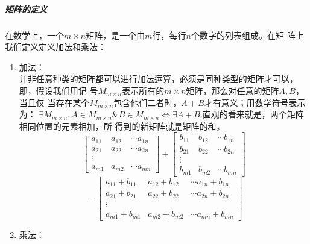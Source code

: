 \documentclass[a4paper,12pt]{ctexart}
\begin{document}
		\subparagraph{矩阵的定义}		
		在数学上，一个$m \times n$矩阵，是一个由$m$行，每行$n$个数字的列表组成。在矩
		阵上我们定义定义加法和乘法：
		\begin{enumerate}
		\item{加法：}\\
		并非任意种类的矩阵都可以进行加法运算，必须是同种类型的矩阵才可以，即，假设我们用记
		号$M_{m \times n}$表示所有的$m \times n$矩阵，那么对任意的矩阵$A,B$，当且仅
		当存在某个$M_{m \times n}$包含他们二者时，$A+B$才有意义；用数学符号表示为：
		$\exists M_{m \times n},A \in M_{m \times n} \& B \in M_{m \times n} 
		\Leftrightarrow \exists A+B$.直观的看来就是，两个矩阵相同位置的元素相加，所
		得到的新矩阵就是矩阵的和。
		\[		
		\left[
		\begin{array}{cccc}
		a_{11} & a_{12} & \cdots a_{1n}\\
		a_{21} & a_{22} & \cdots a_{2n}\\
		\vdots \\
		a_{m1} & a_{m2} & \cdots a_{mn}
				
		\end{array}		
		\right]		
		+
		\left[
		\begin{array}{cccc}
		b_{11} & b_{12} & \cdots b_{1n}\\
		b_{21} & b_{22} & \cdots b_{2n}\\
		\vdots \\
		b_{m1} & b_{m2} & \cdots b_{mn}
				
		\end{array}		
		\right]
		\]
		\[
		=
		\left[
		\begin{array}{cccc}
		a_{11}+b_{11} & a_{12}+b_{12} & \cdots a_{1n}+b_{1n}\\
		a_{21}+b_{21} & a_{22}+b_{22} & \cdots a_{2n}+b_{2n}\\
		\vdots \\
		a_{m1}+b_{m1} & a_{m2}+b_{m2} & \cdots a_{mn}+b_{mn}
				
		\end{array}		
		\right]						
		\]
		\item{乘法：}\\
		
		\end{enumerate}
		
\end{document}
